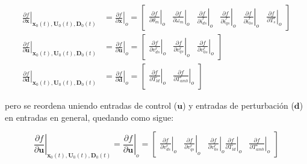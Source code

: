 \documentclass[blue,fullpaper]{ludusofficial}  %
\begin{document}
\begin{equation}
\label{eq:jacobianos}
\begin{aligned}
\left. \frac{\partial f}{\partial \mathbf{x}} \right|_{\mathbf{x}_0(t), \mathbf{U}_0(t), \mathbf{D}_0(t)}  & = \left. \frac{\partial f}{\partial \mathbf{x}} \right|_o = \begin{bmatrix} \left. \frac{\partial f}{\partial \theta_m} \right|_o & \left. \frac{\partial f}{\partial \omega_m} \right|_o & \left. \frac{\partial f}{\partial i_{ds}^r} \right|_o &  \left. \frac{\partial f}{\partial i_{qs}^r} \right|_o  & \left. \frac{\partial f}{\partial i_{0s}^r} \right|_o & \left. \frac{\partial f}{\partial T_s^{\circ}} \right|_o \end{bmatrix} \\
\left. \frac{\partial f}{\partial \mathbf{u}} \right|_{\mathbf{x}_0(t), \mathbf{U}_0(t), \mathbf{D}_0(t)}  & = \left. \frac{\partial f}{\partial \mathbf{u}} \right|_o = \begin{bmatrix} \left. \frac{\partial f}{\partial v_{ds}^{r}} \right|_o & \left. \frac{\partial f}{\partial v_{qs}^{r}} \right|_o & \left. \frac{\partial f}{\partial v_{0s}^{r}} \right|_o \end{bmatrix} \\
\left. \frac{\partial f}{\partial \mathbf{d}} \right|_{\mathbf{x}_0(t), \mathbf{U}_0(t), \mathbf{D}_0(t)}  & = \left. \frac{\partial f}{\partial \mathbf{d}} \right|_o = \begin{bmatrix} \left. \frac{\partial f}{\partial T_{ld}} \right|_o & \left. \frac{\partial f}{\partial T_{amb}^{\circ}} \right|_o \end{bmatrix}
\end{aligned}
\end{equation}

pero se reordena uniendo entradas de control (\(\mathbf{u}\)) y entradas de perturbación (\(\mathbf{d}\)) en entradas en general, quedando como sigue:

\begin{equation}
\label{eq:jacobiano-entradas-ampliadas}
\left. \frac{\partial f}{\partial \mathbf{u}} \right|_{\mathbf{x}_0(t), \mathbf{U}_0(t), \mathbf{D}_0(t)} = \left. \frac{\partial f}{\partial \mathbf{u}} \right|_o = \begin{bmatrix} \left. \frac{\partial f}{\partial v_{ds}^{r}} \right|_o & \left. \frac{\partial f}{\partial v_{qs}^{r}} \right|_o & \left. \frac{\partial f}{\partial v_{0s}^{r}} \right|_o \left.  \frac{\partial f}{\partial T_{ld}} \right|_o & \left. \frac{\partial f}{\partial T_{amb}^{\circ}} \right|_o \end{bmatrix}
\end{equation}
\end{document}
